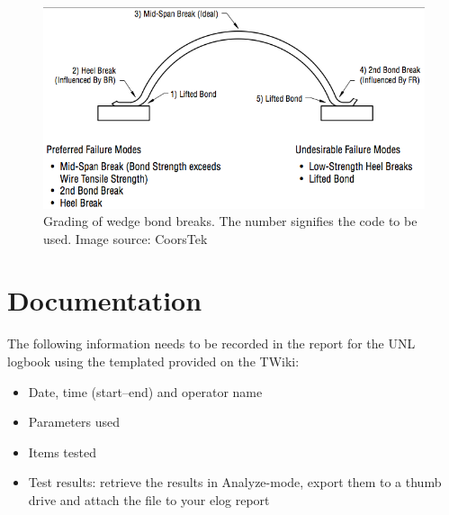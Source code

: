 \documentclass[10pt]{unlsilabsop}
\begin{document}
\begin{figure}[h]
    \begin{center}
        \includegraphics[width=12cm]{img/GradingWedgeBondBreaks.png}
        \caption{Grading of wedge bond breaks. The number signifies the code to be used. Image source: CoorsTek}
        \label{fig:grading}
    \end{center}
\end{figure}

\section{Documentation}
The following information needs to be recorded in the report for the UNL logbook using the templated provided on the TWiki:
\begin{itemize}
\item Date, time (start--end) and operator name
\item Parameters used
\item Items tested
\item Test results: retrieve the results in Analyze-mode, export them to a thumb drive and attach the file to your elog report
\end{itemize}
\end{document}
